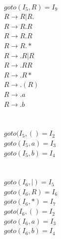 \documentclass[10pt]{letter}
\begin{document}
\begin{enumerate}
\\
$goto(I_{5},R)=I_{9}$\\
$R \rightarrow R|R.$\\
$R \rightarrow R.R$\\
$R \rightarrow R.R$\\
$R \rightarrow R.*$\\
$R \rightarrow .R|R$\\
$R \rightarrow .RR$\\
$R \rightarrow .R*$\\
$R \rightarrow .(R)$\\
$R \rightarrow .a$\\
$R \rightarrow .b$\\
\\
\\
$goto(I_{5},()=I_{2}$\\
$goto(I_{5},a)=I_{3}$\\
$goto(I_{5},b)=I_{4}$\\
\\
\\
$goto(I_{6},|)=I_{5}$\\
$goto(I_{6},R)=I_{6}$\\
$goto(I_{6},*)=I_{7}$\\
$goto(I_{6},()=I_{2}$\\
$goto(I_{6},a)=I_{3}$\\
$goto(I_{6},b)=I_{4}$\\
\\
\\


\end{enumerate}
\end{document}
